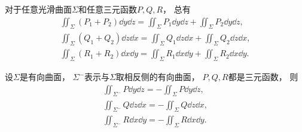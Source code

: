 \begin{property}
对于任意光滑曲面\(\Sigma\)和任意三元函数\(P,Q,R\)，
总有\begin{gather}
	\iint_\Sigma (P_1 + P_2) \dd{y}\dd{z}
	= \iint_\Sigma P_1 \dd{y}\dd{z}
	+ \iint_\Sigma P_2 \dd{y}\dd{z}, \\
	\iint_\Sigma (Q_1 + Q_2) \dd{z}\dd{x}
	= \iint_\Sigma Q_1 \dd{z}\dd{x}
	+ \iint_\Sigma Q_2 \dd{z}\dd{x}, \\
	\iint_\Sigma (R_1 + R_2) \dd{x}\dd{y}
	= \iint_\Sigma R_1 \dd{x}\dd{y}
	+ \iint_\Sigma R_2 \dd{x}\dd{y}.
\end{gather}
\end{property}

\begin{property}
设\(\Sigma\)是有向曲面，
\(\Sigma^-\)表示与\(\Sigma\)取相反侧的有向曲面，
\(P,Q,R\)都是三元函数，
则\begin{gather}
	\iint_{\Sigma^-} P \dd{y}\dd{z}
	= -\iint_\Sigma P \dd{y}\dd{z}, \\
	\iint_{\Sigma^-} Q \dd{z}\dd{x}
	= -\iint_\Sigma Q \dd{z}\dd{x}, \\
	\iint_{\Sigma^-} R \dd{x}\dd{y}
	= -\iint_\Sigma R \dd{x}\dd{y}.
\end{gather}
\end{property}

